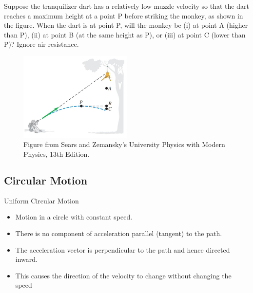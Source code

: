 \documentclass[]{beamer}
\begin{document}
\begin{frame}

    Suppose the tranquilizer dart
    has a relatively low muzzle velocity so that
    the dart reaches a maximum height at a
    point P before striking the monkey,
    as shown in the figure. When the
    dart is at point P, will the monkey
    be (i) at point A (higher than P),
    (ii) at point B (at the same height
    as P), or (iii) at point C (lower
    than P)? Ignore air resistance.

    \vspace{3mm}
    
    \begin{figure}[h!]  
        \includegraphics[width=0.5\textwidth]{images/26.jpg}
         \caption{ {\tiny Figure from Sears and Zemansky's University Physics 
         with Modern Physics, 13th Edition.} }
      \end{figure}


    
      \end{frame}
      




\subsection{ Circular Motion}

\begin{frame}

   Uniform Circular Motion
   \vspace{3mm}
   
   \begin{itemize}
   \item Motion in a circle with constant speed.
    \item There is no component of acceleration parallel (tangent) to the path.
\item The acceleration vector is perpendicular to the path and hence directed inward.
\item This causes the direction of the velocity to change without changing the speed
   \end{itemize}

    
      \end{frame}
      
\end{document}
